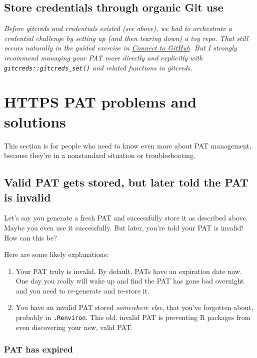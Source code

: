 \documentclass[
]{book}
\providecommand{\tightlist}{%
  \setlength{\itemsep}{0pt}\setlength{\parskip}{0pt}}
\begin{document}
\subsection{Store credentials through organic Git use}\label{store-credentials-through-organic-git-use}

\emph{Before gitcreds and credentials existed (see above), we had to orchestrate a credential challenge by setting up (and then tearing down) a toy repo.
That still occurs naturally in the guided exercise in \hyperref[push-pull-github]{Connect to GitHub}.
But I strongly recommend managing your PAT more directly and explicitly with
\texttt{gitcreds::gitcreds\_set()} and related functions in gitcreds.}

\section{HTTPS PAT problems and solutions}\label{pat-troubleshooting}

This section is for people who need to know even more about PAT management, because they're in a nonstandard situation or troubleshooting.

\subsection{Valid PAT gets stored, but later told the PAT is invalid}\label{valid-pat-gets-stored-but-later-told-the-pat-is-invalid}

Let's say you generate a fresh PAT and successfully store it as described above.
Maybe you even use it successfully.
But later, you're told your PAT is invalid!
How can this be?

Here are some likely explanations:

\begin{enumerate}
\def\labelenumi{\arabic{enumi}.}
\tightlist
\item
  Your PAT truly is invalid. By default, PATs have an expiration date now. One
  day you really will wake up and find the PAT has gone bad overnight and you
  need to re-generate and re-store it.
\item
  You have an invalid PAT stored \emph{somewhere else}, that you've forgotten about,
  probably in \texttt{.Renviron}. This old, invalid PAT is preventing R packages from
  even discovering your new, valid PAT.
\end{enumerate}

\subsubsection{PAT has expired}\label{regenerate-pat}
\end{document}
